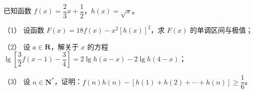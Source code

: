 \begin{question}
已知函数 $f(x)=\dfrac23x+\dfrac12$，$h(x)=\sqrt x$。

（1） 设函数 $F(x)=18f(x)-x^2[h(x)]^2$，求 $F(x)$ 的单调区间与极值；

（2） 设 $a\in\mathbf R$，解关于 $x$ 的方程 $\lg\left[\dfrac32f(x-1)-\dfrac34\right]=2\lg h(a-x)-2\lg h(4-x)$；

（3） 设 $n\in\mathbf N^*$，证明：$f(n)h(n)-[h(1)+h(2)+\cdots+h(n)]\geqslant\dfrac16$。

\end{question}